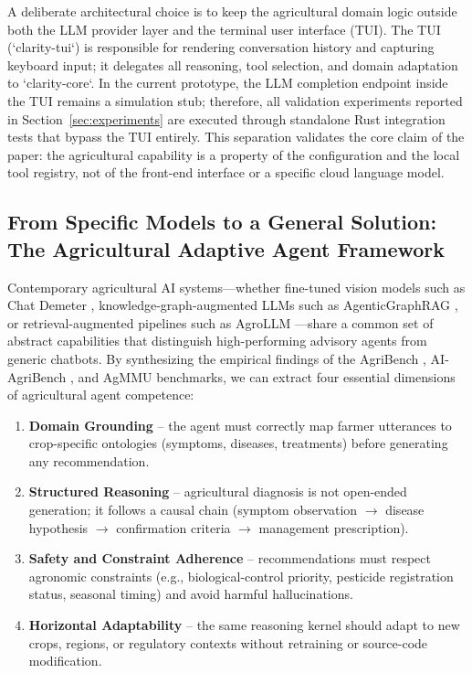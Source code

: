 \documentclass[11pt,a4paper]{article}
\begin{document}
A deliberate architectural choice is to keep the agricultural domain logic outside both the LLM provider layer and the terminal user interface (TUI). The TUI (`clarity-tui`) is responsible for rendering conversation history and capturing keyboard input; it delegates all reasoning, tool selection, and domain adaptation to `clarity-core`. In the current prototype, the LLM completion endpoint inside the TUI remains a simulation stub; therefore, all validation experiments reported in Section~\ref{sec:experiments} are executed through standalone Rust integration tests that bypass the TUI entirely. This separation validates the core claim of the paper: the agricultural capability is a property of the configuration and the local tool registry, not of the front-end interface or a specific cloud language model.

\subsection{From Specific Models to a General Solution: The Agricultural Adaptive Agent Framework}

Contemporary agricultural AI systems---whether fine-tuned vision models such as Chat Demeter \cite{chatdemeter2025}, knowledge-graph-augmented LLMs such as AgenticGraphRAG \cite{agenticgraphrag2025}, or retrieval-augmented pipelines such as AgroLLM \cite{samuel2025agrollm}---share a common set of abstract capabilities that distinguish high-performing advisory agents from generic chatbots. By synthesizing the empirical findings of the AgriBench \cite{deepplants2024agribench}, AI-AgriBench \cite{anshankul2024}, and AgMMU \cite{agmmu2025} benchmarks, we can extract four essential dimensions of agricultural agent competence:

\begin{enumerate}[label=\textbf{D\arabic*:},leftmargin=*]
    \item \textbf{Domain Grounding} -- the agent must correctly map farmer utterances to crop-specific ontologies (symptoms, diseases, treatments) before generating any recommendation.
    \item \textbf{Structured Reasoning} -- agricultural diagnosis is not open-ended generation; it follows a causal chain (symptom observation $\rightarrow$ disease hypothesis $\rightarrow$ confirmation criteria $\rightarrow$ management prescription).
    \item \textbf{Safety and Constraint Adherence} -- recommendations must respect agronomic constraints (e.g., biological-control priority, pesticide registration status, seasonal timing) and avoid harmful hallucinations.
    \item \textbf{Horizontal Adaptability} -- the same reasoning kernel should adapt to new crops, regions, or regulatory contexts without retraining or source-code modification.
\end{enumerate}
\end{document}
